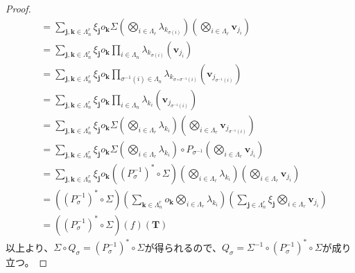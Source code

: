 \documentclass[dvipdfmx]{jsarticle}
\begin{document}
\begin{proof}
\begin{align*}
&= \sum_{\mathbf{j},\mathbf{k} \in \varLambda_{n}^{r}} {\xi_{\mathbf{j}}o_{\mathbf{k}}\varSigma\left( \bigotimes_{i \in \varLambda_{r}} \lambda_{k_{\sigma(i)}} \right)\left( \bigotimes_{i \in \varLambda_{r}} \mathbf{v}_{j_{i}} \right)}\\
&= \sum_{\mathbf{j},\mathbf{k} \in \varLambda_{n}^{r}} {\xi_{\mathbf{j}}o_{\mathbf{k}}\prod_{i \in \varLambda_{n}} {\lambda_{k_{\sigma(i)}}\left( \mathbf{v}_{j_{i}} \right)}}\\
&= \sum_{\mathbf{j},\mathbf{k} \in \varLambda_{n}^{r}} {\xi_{\mathbf{j}}o_{\mathbf{k}}\prod_{\sigma^{- 1}(i) \in \varLambda_{n}} {\lambda_{k_{\sigma \circ \sigma^{- 1}(i)}}\left( \mathbf{v}_{j_{\sigma^{- 1}(i)}} \right)}}\\
&= \sum_{\mathbf{j},\mathbf{k} \in \varLambda_{n}^{r}} {\xi_{\mathbf{j}}o_{\mathbf{k}}\prod_{i \in \varLambda_{n}} {\lambda_{k_{i}}\left( \mathbf{v}_{j_{\sigma^{- 1}(i)}} \right)}}\\
&= \sum_{\mathbf{j},\mathbf{k} \in \varLambda_{n}^{r}} {\xi_{\mathbf{j}}o_{\mathbf{k}}\varSigma\left( \bigotimes_{i \in \varLambda_{r}} \lambda_{k_{i}} \right)\left( \bigotimes_{i \in \varLambda_{r}} \mathbf{v}_{j_{\sigma^{- 1}(i)}} \right)}\\
&= \sum_{\mathbf{j},\mathbf{k} \in \varLambda_{n}^{r}} {\xi_{\mathbf{j}}o_{\mathbf{k}}\varSigma\left( \bigotimes_{i \in \varLambda_{r}} \lambda_{k_{i}} \right) \circ P_{\sigma^{- 1}}\left( \bigotimes_{i \in \varLambda_{r}} \mathbf{v}_{j_{i}} \right)}\\
&= \sum_{\mathbf{j},\mathbf{k} \in \varLambda_{n}^{r}} {\xi_{\mathbf{j}}o_{\mathbf{k}}\left( \left( P_{\sigma}^{- 1} \right)^{*} \circ \varSigma \right)\left( \bigotimes_{i \in \varLambda_{r}} \lambda_{k_{i}} \right)\left( \bigotimes_{i \in \varLambda_{r}} \mathbf{v}_{j_{i}} \right)}\\
&= \left( \left( P_{\sigma}^{- 1} \right)^{*} \circ \varSigma \right)\left( \sum_{\mathbf{k} \in \varLambda_{n}^{r}} {o_{\mathbf{k}}\bigotimes_{i \in \varLambda_{r}} \lambda_{k_{i}}} \right)\left( \sum_{\mathbf{j} \in \varLambda_{n}^{r}} {\xi_{\mathbf{j}}\bigotimes_{i \in \varLambda_{r}} \mathbf{v}_{j_{i}}} \right)\\
&= \left( \left( P_{\sigma}^{- 1} \right)^{*} \circ \varSigma \right)(f)\left( \mathbf{T} \right)
\end{align*}
以上より、$\varSigma \circ Q_{\sigma} = \left( P_{\sigma}^{- 1} \right)^{*} \circ \varSigma$が得られるので、$Q_{\sigma} = \varSigma^{- 1} \circ \left( P_{\sigma}^{- 1} \right)^{*} \circ \varSigma$が成り立つ。
\end{proof}
\end{document}
